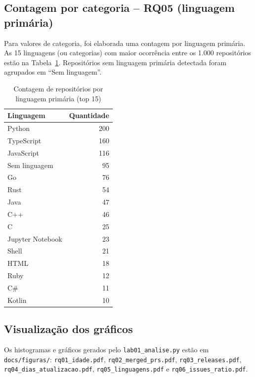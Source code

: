 \documentclass[12pt,a4paper]{article}
\begin{document}
\subsection*{Contagem por categoria -- RQ05 (linguagem primária)}

Para valores de categoria, foi elaborada uma contagem por linguagem primária. As 15 linguagens (ou categorias) com maior ocorrência entre os 1.000 repositórios estão na Tabela~\ref{tab:linguagens}. Repositórios sem linguagem primária detectada foram agrupados em ``Sem linguagem''.

\begin{table}[H]
    \centering
    \caption{Contagem de repositórios por linguagem primária (top 15)}
    \label{tab:linguagens}
    \begin{tabular}{lr}
        \toprule
        \textbf{Linguagem} & \textbf{Quantidade} \\
        \midrule
        Python & 200 \\
        TypeScript & 160 \\
        JavaScript & 116 \\
        Sem linguagem & 95 \\
        Go & 76 \\
        Rust & 54 \\
        Java & 47 \\
        C++ & 46 \\
        C & 25 \\
        Jupyter Notebook & 23 \\
        Shell & 21 \\
        HTML & 18 \\
        Ruby & 12 \\
        C\# & 11 \\
        Kotlin & 10 \\
        \bottomrule
    \end{tabular}
\end{table}

\subsection*{Visualização dos gráficos}

Os histogramas e gráficos gerados pelo \texttt{lab01\_analise.py} estão em \texttt{docs/figuras/}: \texttt{rq01\_idade.pdf}, \texttt{rq02\_merged\_prs.pdf}, \texttt{rq03\_releases.pdf}, \texttt{rq04\_dias\_atualizacao.pdf}, \texttt{rq05\_linguagens.pdf} e \texttt{rq06\_issues\_ratio.pdf}.
\end{document}
